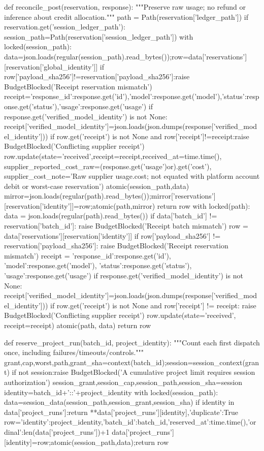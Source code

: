def reconcile_post(reservation, response):
    """Preserve raw usage; no refund or inference about credit allocation."""
    path = Path(reservation['ledger_path'])
    if reservation.get('session_ledger_path'):
        session_path=Path(reservation['session_ledger_path'])
        with locked(session_path):
            data=json.loads(regular(session_path).read_bytes());row=data['reservations'][reservation['global_identity']]
            if row['payload_sha256']!=reservation['payload_sha256']:raise BudgetBlocked('Receipt reservation mismatch')
            receipt={'response_id':response.get('id'),'model':response.get('model'),'status':response.get('status'),'usage':response.get('usage')}
            if response.get('verified_model_identity') is not None:
                receipt['verified_model_identity']=json.loads(json.dumps(response['verified_model_identity']))
            if row.get('receipt') is not None and row['receipt']!=receipt:raise BudgetBlocked('Conflicting supplier receipt')
            row.update(state='received',receipt=receipt,received_at=time.time(),
                supplier_reported_cost_raw=(response.get('usage')or{}).get('cost'),
                supplier_cost_note='Raw supplier usage.cost; not equated with platform account debit or worst-case reservation')
            atomic(session_path,data)
            mirror=json.loads(regular(path).read_bytes());mirror['reservations'][reservation['identity']]=row;atomic(path,mirror)
            return row
    with locked(path):
        data = json.loads(regular(path).read_bytes())
        if data['batch_id'] != reservation['batch_id']: raise BudgetBlocked('Receipt batch mismatch')
        row = data['reservations'][reservation['identity']]
        if row['payload_sha256'] != reservation['payload_sha256']: raise BudgetBlocked('Receipt reservation mismatch')
        receipt = {'response_id':response.get('id'), 'model':response.get('model'),
                   'status':response.get('status'), 'usage':response.get('usage')}
        if response.get('verified_model_identity') is not None:
            receipt['verified_model_identity']=json.loads(json.dumps(response['verified_model_identity']))
        if row.get('receipt') is not None and row['receipt'] != receipt:
            raise BudgetBlocked('Conflicting supplier receipt')
        row.update(state='received', receipt=receipt)
        atomic(path, data)
    return row

def reserve_project_run(batch_id, project_identity):
    """Count each first dispatch once, including failures/timeouts/controls."""
    grant,cap,worst,path,grant_sha=context(batch_id);session=session_context(grant)
    if not session:raise BudgetBlocked('A cumulative project limit requires session authorization')
    session_grant,session_cap,session_path,session_sha=session
    identity=batch_id+'::'+project_identity
    with locked(session_path):
        data=session_data(session_path,session_grant,session_sha)
        if identity in data['project_runs']:return {**data['project_runs'][identity],'duplicate':True}
        row={'identity':project_identity,'batch_id':batch_id,'reserved_at':time.time(),'ordinal':len(data['project_runs'])+1}
        data['project_runs'][identity]=row;atomic(session_path,data);return row

